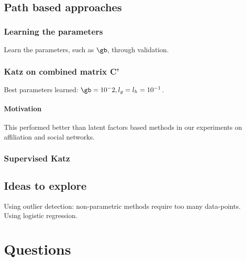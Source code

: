 \documentclass{report}
\begin{document}
\subsection{Path based approaches}
\subsubsection{Learning the parameters}
Learn the parameters, such as $\gb$, through validation.

\subsubsection{Katz on combined matrix C'}
Best parameters learned: $\gb = 10^-2, l_g = l_h = 10^{-1}$.

\paragraph*{Motivation}
This performed better than latent factors based methods in our experiments on affiliation and social networks.

\subsubsection{Supervised Katz}
\tbc


\subsection{Ideas to explore}
Using outlier detection: non-parametric methods require too many data-points. Using logistic regression. 



\section{Questions}



\end{document}
